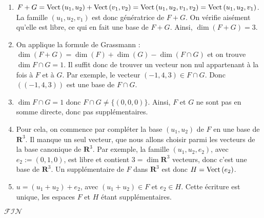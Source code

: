 \documentclass[12pt,a4paper]{article}
\renewcommand{\dim}{\mathop{\mathrm{dim}}\nolimits}
\def\Vect{{\rm Vect\,}}
\begin{document}
\begin{enumerate}
	\vspace{0.5\baselineskip}
	
	\item $\displaystyle F+G = \Vect(u_1,u_2)+ \Vect(v_1,v_2) = \Vect(u_1,u_2,v_1,v_2) = \Vect(u_1,u_2,v_1)$. La famille $(u_1,u_2,v_1)$ est donc génératrice de $F+G$. On vérifie aisément qu'elle est libre, ce qui en fait une base de $F+G$. Ainsi, $\dim(F+G) = 3$.
	
	\vspace{0.5\baselineskip}
	
	\item On applique la formule de Grassmann : $\displaystyle \dim (F+G) = \dim(F)+\dim(G)-\dim(F\cap G)$ et on trouve $\displaystyle \dim F \cap G = 1$. Il suffit donc de trouver un vecteur non nul appartenant à la fois à $F$ et à $G$. Par exemple, le vecteur $(-1,4,3) \in F \cap G$. Donc $((-1,4,3))$ est une base de $F \cap G$.
	
	\vspace{0.5\baselineskip}
	
	\item $\dim F \cap G = 1$ donc $F \cap G \neq \{(0,0,0)\}$. Ainsi, $F$ et $G$ ne sont pas en somme directe, donc pas supplémentaires.
	
	\vspace{0.5\baselineskip}
	
	\item Pour cela, on commence par compléter la base $(u_1, u_2)$ de $F$ en une base de $\mathbf{R}^3$. Il manque un seul vecteur, que nous allons choisir parmi les vecteurs de la base canonique de $\mathbf{R}^3$. Par exemple, la famille $(u_1, u_2, e_2)$, avec $e_2 := (0,1,0)$, est libre et contient $3 = \dim \mathbf{R}^3$ vecteurs, donc c'est une base de $\mathbf{R}^3$. Un supplémentaire de $F$ dans $\mathbf{R}^3$ est donc $H = \Vect(e_2)$.
	
	\vspace{0.5\baselineskip}
	
	\item $\displaystyle u = (u_1 + u_2) + e_2$, avec $(u_1 + u_2) \in F$ et $e_2 \in H$. Cette écriture est unique, les espaces $F$ et $H$ étant supplémentaires.
\end{enumerate}


\vspace{2\baselineskip}

\begin{center}
	\huge $\mathcal{FIN}$
\end{center}
\end{document}
